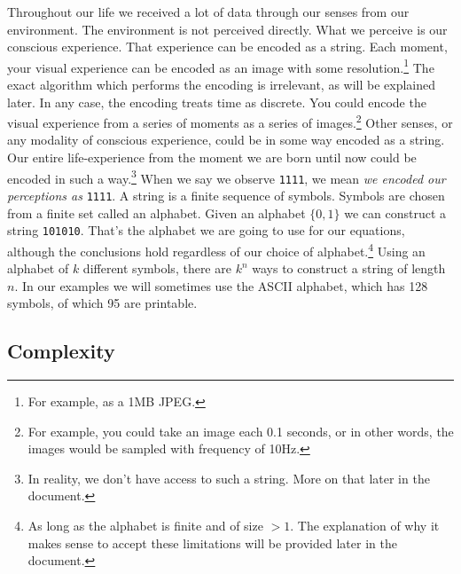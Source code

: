 Throughout our life we received a lot of data through our senses from our environment.
The environment is not perceived directly.
What we perceive is our conscious experience.
That experience can be encoded as a string.
Each moment, your visual experience can be encoded as an image with some resolution.\footnote{For example, as a 1MB JPEG.}
The exact algorithm which performs the encoding is irrelevant, as will be explained later.
In any case, the encoding treats time as discrete.
You could encode the visual experience from a series of moments as a series of images.\footnote{For example, you could take an image each 0.1 seconds, or in other words, the images would be sampled with frequency of 10Hz.}
Other senses, or any modality of conscious experience, could be in some way encoded as a string.
Our entire life-experience from the moment we are born until now could be encoded in such a way.\footnote{In reality, we don't have access to such a string. More on that later in the document.}
When we say we observe \texttt{1111}, we mean \textit{we encoded our perceptions as} \texttt{1111}.
A string is a finite sequence of symbols.
Symbols are chosen from a finite set called an alphabet.
Given an alphabet $\{0,1\}$ we can construct a string \texttt{101010}.
That's the alphabet we are going to use for our equations, although the conclusions hold regardless of our choice of alphabet.\footnote{As long as the alphabet is finite and of size $>1$. The explanation of why it makes sense to accept these limitations will be provided later in the document.}
Using an alphabet of $k$ different symbols, there are $k^n$ ways to construct a string of length $n$.
In our examples we will sometimes use the ASCII alphabet, which has 128 symbols, of which 95 are printable.

\newpage

\subsection{Complexity}

